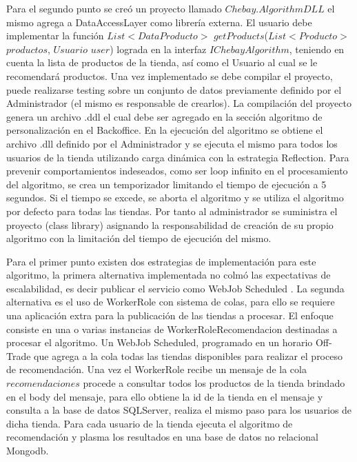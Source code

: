 \documentclass[journal]{IEEEtran}
\begin{document}
Para el segundo punto se creó un proyecto llamado $Chebay.AlgorithmDLL$ el mismo agrega a DataAccessLayer como librería externa.
El usuario debe implementar la función $List<DataProducto>$ $getProducts$($List<Producto>$ $productos$, $Usuario$ $user$) lograda en la interfaz $IChebayAlgorithm$, teniendo en cuenta la lista de productos de la tienda, así como el Usuario al cual se le recomendará productos.
Una vez implementado se debe compilar el proyecto, puede realizarse testing sobre un conjunto de datos previamente definido por el Administrador (el mismo es responsable de crearlos). La compilación del proyecto genera un archivo .ddl el cual debe ser agregado en la sección algoritmo de personalización en el Backoffice.
En la ejecución del algoritmo se obtiene el archivo .dll definido por el Administrador y se ejecuta el mismo para todos los usuarios de la tienda utilizando carga dinámica con la estrategia Reflection. Para prevenir comportamientos indeseados, como ser loop infinito en el procesamiento del algoritmo, se crea un temporizador limitando el tiempo de ejecución a 5 segundos. Si el tiempo se excede, se aborta el algoritmo y se utiliza el algoritmo por defecto para todas las tiendas.
Por tanto al administrador se suministra el proyecto (class library) asignando la responsabilidad de creación de su propio algoritmo con la limitación del tiempo de ejecución del mismo.

Para el primer punto existen dos estrategias de implementación para este algoritmo, la primera alternativa implementada no colmó las expectativas de escalabilidad, es decir publicar el servicio como WebJob Scheduled \cite{url:webjob}. La segunda alternativa es el uso de WorkerRole con sistema de colas, para ello se requiere una aplicación extra para la publicación de las tiendas a procesar.
El enfoque consiste en una o varias instancias de WorkerRoleRecomendacion destinadas a procesar el algoritmo. Un WebJob Scheduled, programado en un horario Off-Trade que agrega a la cola todas las tiendas disponibles para realizar el proceso de recomendación. Una vez el WorkerRole recibe un mensaje de la cola $recomendaciones$ procede a consultar todos los productos de la tienda brindado en el body del mensaje, para ello obtiene la id de la tienda en el mensaje y consulta a la base de datos SQLServer, realiza el mismo paso para los usuarios de dicha tienda. Para cada usuario de la tienda ejecuta el algoritmo de recomendación y plasma los resultados en una base de datos no relacional Mongodb.
\end{document}
